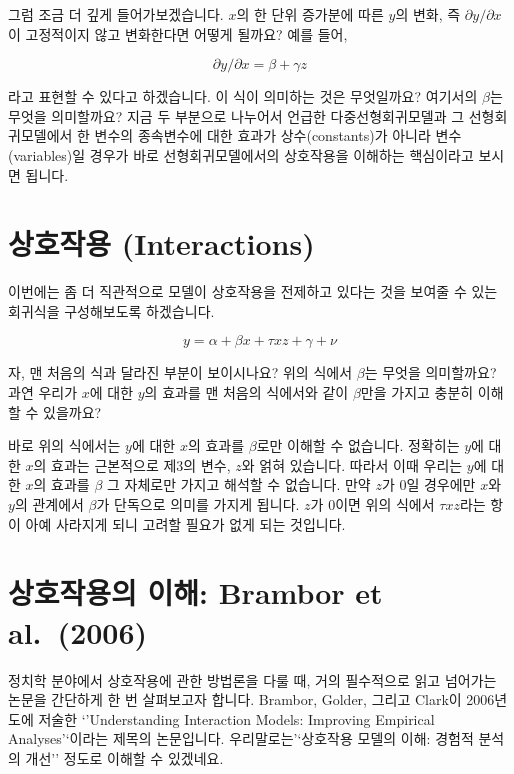 \documentclass[
]{book}
\begin{document}
그럼 조금 더 깊게 들어가보겠습니다. \(x\)의 한 단위 증가분에 따른 \(y\)의 변화, 즉 \(\partial y/\partial x\)이 고정적이지 않고 변화한다면 어떻게 될까요? 예를 들어,

\[
\partial y/\partial x = \beta + \gamma z
\]

라고 표현할 수 있다고 하겠습니다. 이 식이 의미하는 것은 무엇일까요? 여기서의 \(\beta\)는 무엇을 의미할까요? 지금 두 부분으로 나누어서 언급한 다중선형회귀모델과 그 선형회귀모델에서 한 변수의 종속변수에 대한 효과가 상수(constants)가 아니라 변수(variables)일 경우가 바로 선형회귀모델에서의 상호작용을 이해하는 핵심이라고 보시면 됩니다.

\hypertarget{uxc0c1uxd638uxc791uxc6a9-interactions}{%
\section{상호작용 (Interactions)}\label{uxc0c1uxd638uxc791uxc6a9-interactions}}

이번에는 좀 더 직관적으로 모델이 상호작용을 전제하고 있다는 것을 보여줄 수 있는 회귀식을 구성해보도록 하겠습니다.

\[
y = \alpha +\beta x + \tau xz + \gamma + \nu
\]

자, 맨 처음의 식과 달라진 부분이 보이시나요? 위의 식에서 \(\beta\)는 무엇을 의미할까요? 과연 우리가 \(x\)에 대한 \(y\)의 효과를 맨 처음의 식에서와 같이 \(\beta\)만을 가지고 충분히 이해할 수 있을까요?

바로 위의 식에서는 \(y\)에 대한 \(x\)의 효과를 \(\beta\)로만 이해할 수 없습니다. 정확히는 \(y\)에 대한 \(x\)의 효과는 근본적으로 제3의 변수, \(z\)와 얽혀 있습니다. 따라서 이때 우리는 \(y\)에 대한 \(x\)의 효과를 \(\beta\) 그 자체로만 가지고 해석할 수 없습니다. 만약 \(z\)가 0일 경우에만 \(x\)와 \(y\)의 관계에서 \(\beta\)가 단독으로 의미를 가지게 됩니다. \(z\)가 0이면 위의 식에서 \(\tau xz\)라는 항이 아예 사라지게 되니 고려할 필요가 없게 되는 것입니다.

\hypertarget{uxc0c1uxd638uxc791uxc6a9uxc758-uxc774uxd574-brambor-et-al.-2006}{%
\section{상호작용의 이해: Brambor et al.~(2006)}\label{uxc0c1uxd638uxc791uxc6a9uxc758-uxc774uxd574-brambor-et-al.-2006}}

정치학 분야에서 상호작용에 관한 방법론을 다룰 때, 거의 필수적으로 읽고 넘어가는 논문을 간단하게 한 번 살펴보고자 합니다. Brambor, Golder, 그리고 Clark이 2006년도에 저술한 `'Understanding Interaction Models: Improving Empirical Analyses'`이라는 제목의 논문입니다. 우리말로는'`상호작용 모델의 이해: 경험적 분석의 개선'' 정도로 이해할 수 있겠네요.
\end{document}
